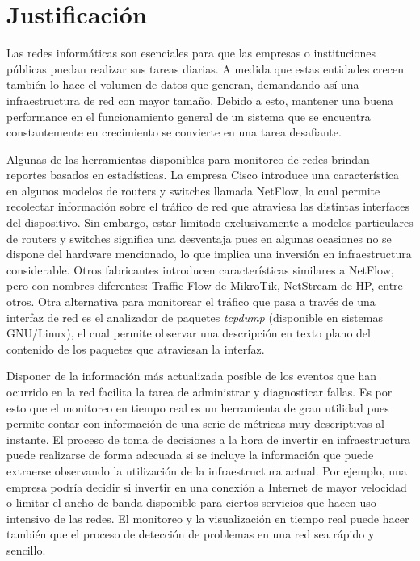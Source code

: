 \section*{Justificación}
Las redes informáticas son esenciales para que las empresas o instituciones públicas puedan realizar sus tareas diarias. A medida que estas entidades crecen también lo hace el volumen de datos que generan, demandando así una infraestructura de red con mayor tamaño. Debido a esto, mantener una buena performance en el funcionamiento general de un sistema que se encuentra constantemente en crecimiento se convierte en una tarea desafiante.

Algunas de las herramientas disponibles para monitoreo de redes brindan reportes basados en estadísticas. La empresa Cisco\textsuperscript{\textregistered} introduce una característica en algunos modelos de routers y switches llamada NetFlow, la cual permite recolectar información sobre el tráfico de red que atraviesa las distintas interfaces del dispositivo. Sin embargo, estar limitado exclusivamente a modelos particulares de routers y switches significa una desventaja pues en algunas ocasiones no se dispone del hardware mencionado, lo que implica una inversión en infraestructura considerable. Otros fabricantes introducen características similares a NetFlow, pero con nombres diferentes: Traffic Flow de MikroTik, NetStream de HP, entre otros.
Otra alternativa para monitorear el tráfico que pasa a través de una interfaz de red es el analizador de paquetes \textit{tcpdump} (disponible en sistemas GNU/Linux), el cual permite observar una descripción en texto plano del contenido de los paquetes que atraviesan la interfaz.

Disponer de la información más actualizada posible de los eventos que han ocurrido en la red facilita la tarea de administrar y diagnosticar fallas. Es por esto que el monitoreo en tiempo real es un herramienta de gran utilidad pues permite contar con información de una serie de métricas muy descriptivas al instante. El proceso de toma de decisiones a la hora de invertir en infraestructura puede realizarse de forma adecuada si se incluye la información que puede extraerse observando la utilización de la infraestructura actual. Por ejemplo, una empresa podría decidir si invertir en una conexión a Internet de mayor velocidad o limitar el ancho de banda disponible para ciertos servicios que hacen uso intensivo de las redes. El monitoreo y la visualización en tiempo real puede hacer también que el proceso de detección de problemas en una red sea rápido y sencillo.

